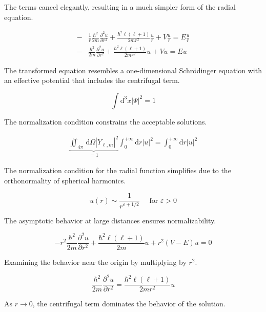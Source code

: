 The terms cancel elegantly, resulting in a much simpler form of the radial equation.

\begin{align}
- & \frac{1}{r} \frac{\hbar^{2}}{2 m} \frac{\partial^{2} u}{\partial r^{2}}+\frac{\hbar^{2} \ell(\ell+1)}{2 m r^{2}} \frac{u}{r}+V \frac{u}{r}=E \frac{u}{r}  \\
- & \frac{\hbar^{2}}{2 m} \frac{\partial^{2} u}{\partial r^{2}}+\frac{\hbar^{2} \ell(\ell+1)}{2 m r^{2}} u+V u=E u
\end{align}

The transformed equation resembles a one-dimensional Schrödinger equation with an effective potential that includes the centrifugal term.

\begin{equation}
\int \mathrm{d}^{3} x|\Psi|^{2}=1
\end{equation}

The normalization condition constrains the acceptable solutions.

\begin{align}
\underbrace{\iint_{4 \pi} \, \mathrm{d} \Omega\left|Y_{\ell, m}\right|^{2}}_{=1} \int_{0}^{+\infty} \mathrm{d} r |u|^{2} = \int_{0}^{+\infty} \mathrm{d} r|u|^{2}
\end{align}

The normalization condition for the radial function simplifies due to the orthonormality of spherical harmonics.

\begin{equation}
u(r) \sim \frac{1}{r^{\varepsilon+1 / 2}} \quad \text { for } \varepsilon>0
\end{equation}

The asymptotic behavior at large distances ensures normalizability.

\begin{equation}
-r^{2} \frac{\hbar^{2}}{2 m} \frac{\partial^{2} u}{\partial r^{2}}+\frac{\hbar^{2} \ell(\ell+1)}{2 m} u+r^{2}(V-E) u=0
\end{equation}

Examining the behavior near the origin by multiplying by $r^2$.

\begin{equation}
\frac{\hbar^{2}}{2 m} \frac{\partial^{2} u}{\partial r^{2}}=\frac{\hbar^{2} \ell(\ell+1)}{2 m r^{2}} u
\end{equation}

As $r \to 0$, the centrifugal term dominates the behavior of the solution.

